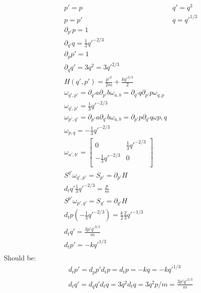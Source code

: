 \documentclass[aps,pra,10pt,twocolumn,floatfix,nofootinbib]{revtex4-1}
\theoremstyle{definition}
\begin{document}
\begin{align*}
&p' = p &q' = q^3 \\
&p = p' &q = q'^{1/3} \\
&\partial_{p'}p=1 \\
&\partial_{q'}q=\frac{1}{3}q'^{-2/3} \\
&\partial_{p}p'=1 \\
&\partial_{q}q'=3q^2=3q'^{2/3} \\
&H(q',p') = \frac{p'^2}{2m} + \frac{kq'^{2/3}}{2}  \\
&\omega_{q',p'} = \partial_{q'}a \partial_{p'}b \omega_{a,b} = \partial_{q'}q \partial_{p'}p \omega_{q,p} \\
&\omega_{q',p'} = \frac{1}{3}q'^{-2/3} \\
&\omega_{p',q'} = \partial_{p'}a \partial_{q'}b \omega_{a,b} = \partial_{p'}p \partial_{q'}q \omega{p,q} \\
&\omega_{p,q} = -\frac{1}{3}q'^{-2/3} \\
&\omega_{a', b'} =  \left[
  \begin{array}{cc}
    0 & \frac{1}{3}q'^{-2/3} \\
    -\frac{1}{3}q'^{-2/3} & 0 \\
  \end{array}
\right] \\
&S^{q'} \omega_{q', p'} = S_{p'} = \partial_{p'} H \\
&d_tq' \frac{1}{3}q'^{-2/3} = \frac{p}{m} \\
&S^{p'} \omega_{p', q'} = S_{q'} = \partial_{q'} H \\
&d_tp (-\frac{1}{3}q'^{-2/3}) = \frac{k}{2} \frac{2}{3} q'^{-1/3} \\
&d_tq' = \frac{3p'q'^{3/2}}{m} \\
&d_tp' = - k q'^{1/3} \\
\end{align*}
Should be:
\begin{align*}
&d_tp'=d_pp'd_tp=d_tp=-kq=-kq'^{1/3} \\
&d_tq'=d_qq'd_tq=3q^2d_tq=3q^2p/m=\frac{3p'q'^{2/3}}{m}
\end{align*}
\end{document}
